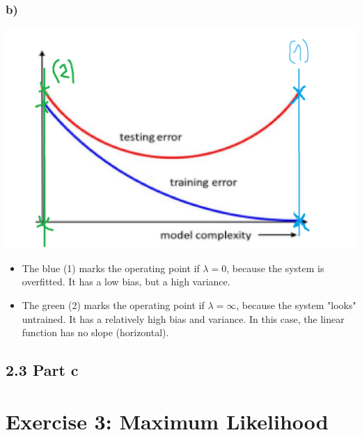 \documentclass[a4paper]{article}
\begin{document}
        \subsubsection*{b)}
        \includegraphics[width=0.6\linewidth]{2.2.png}
        \begin{itemize}
            \item The blue (1) marks the operating point if $\lambda=0$, because the system is overfitted. It has a low bias, but a high variance.
            \item The green (2) marks the operating point if $\lambda=\infty$, because the system "looks" untrained. It has a relatively high bias and variance. In this case, the linear function has no slope (horizontal).
        \end{itemize}
        
    \subsection*{2.3 Part c}
        


\newpage
\section*{Exercise 3: Maximum Likelihood}
\end{document}
